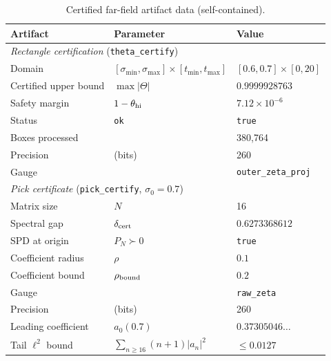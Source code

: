 \documentclass[11pt]{article}
\theoremstyle{definition}
\theoremstyle{remark}
\theoremstyle{definition}
\begin{document}
\begin{table}[H]
\centering
\caption{Certified far-field artifact data (self-contained).}\label{tab:artifact-data}
\small
\begin{tabular}{l l l}
\toprule
\textbf{Artifact} & \textbf{Parameter} & \textbf{Value} \\
\midrule
\multicolumn{3}{l}{\textit{Rectangle certification} (\texttt{theta\_certify})} \\
\quad Domain & $[\sigma_{\min}, \sigma_{\max}] \times [t_{\min}, t_{\max}]$ & $[0.6, 0.7] \times [0, 20]$ \\
\quad Certified upper bound & $\max |\Theta|$ & $0.9999928763$ \\
\quad Safety margin & $1 - \theta_{\rm hi}$ & $7.12 \times 10^{-6}$ \\
\quad Status & \texttt{ok} & \texttt{true} \\
\quad Boxes processed & & 380{,}764 \\
\quad Precision & (bits) & 260 \\
\quad Gauge & & \texttt{outer\_zeta\_proj} \\
\midrule
\multicolumn{3}{l}{\textit{Pick certificate} (\texttt{pick\_certify}, $\sigma_0 = 0.7$)} \\
\quad Matrix size & $N$ & 16 \\
\quad Spectral gap & $\delta_{\rm cert}$ & $0.6273368612$ \\
\quad SPD at origin & $P_N \succ 0$ & \texttt{true} \\
\quad Coefficient radius & $\rho$ & $0.1$ \\
\quad Coefficient bound & $\rho_{\rm bound}$ & $0.2$ \\
\quad Gauge & & \texttt{raw\_zeta} \\
\quad Precision & (bits) & 260 \\
\quad Leading coefficient & $a_0(0.7)$ & $0.37305046\ldots$ \\
\quad Tail $\ell^2$ bound & $\sum_{n\ge 16}(n+1)|a_n|^2$ & $\le 0.0127$ \\
\bottomrule
\end{tabular}
\end{table}
\end{document}
